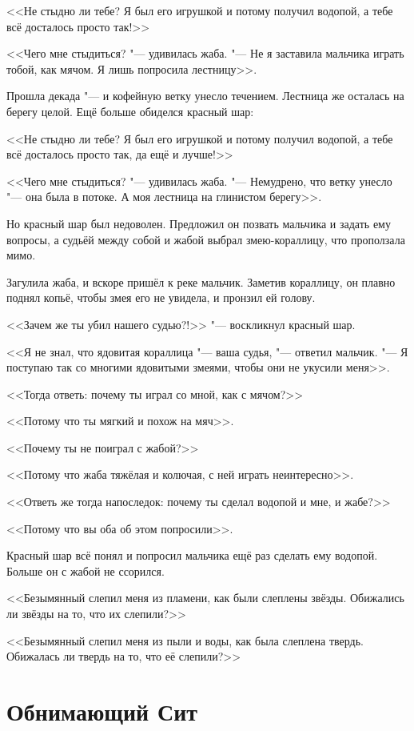 <<Не стыдно ли тебе?
Я был его игрушкой и потому получил водопой, а тебе всё досталось просто так!>>

<<Чего мне стыдиться? "--- удивилась жаба.
"--- Не я заставила мальчика играть тобой, как мячом.
Я лишь попросила лестницу>>.

Прошла декада "--- и кофейную ветку унесло течением.
Лестница же осталась на берегу целой.
Ещё больше обиделся красный шар:

<<Не стыдно ли тебе?
Я был его игрушкой и потому получил водопой, а тебе всё досталось просто так, да ещё и лучше!>>

<<Чего мне стыдиться? "--- удивилась жаба.
"--- Немудрено, что ветку унесло "--- она была в потоке.
А моя лестница на глинистом берегу>>.

Но красный шар был недоволен.
Предложил он позвать мальчика и задать ему вопросы, а судьёй между собой и жабой выбрал змею-кораллицу, что проползала мимо.

Загулила жаба, и вскоре пришёл к реке мальчик.
Заметив кораллицу, он плавно поднял копьё, чтобы змея его не увидела, и пронзил ей голову.

<<Зачем же ты убил нашего судью?!>> "--- воскликнул красный шар.

<<Я не знал, что ядовитая кораллица "--- ваша судья, "--- ответил мальчик.
"--- Я поступаю так со многими ядовитыми змеями, чтобы они не укусили меня>>.

<<Тогда ответь: почему ты играл со мной, как с мячом?>>

<<Потому что ты мягкий и похож на мяч>>.

<<Почему ты не поиграл с жабой?>>

<<Потому что жаба тяжёлая и колючая, с ней играть неинтересно>>.

<<Ответь же тогда напоследок: почему ты сделал водопой и мне, и жабе?>>

<<Потому что вы оба об этом попросили>>.

Красный шар всё понял и попросил мальчика ещё раз сделать ему водопой.
Больше он с жабой не ссорился.

\spacing

<<Безымянный слепил меня из пламени, как были слеплены звёзды.
Обижались ли звёзды на то, что их слепили?>>

<<Безымянный слепил меня из пыли и воды, как была слеплена твердь.
Обижалась ли твердь на то, что её слепили?>>

\section{Обнимающий Сит}

